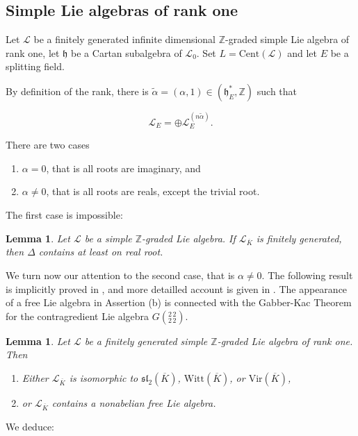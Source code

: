 \documentclass[11pt, letterpaper, reqno]{amsart}
\newtheorem{lemma}[theorem]{Lemma}
\theoremstyle{definition}
\newcommand{\Z}{{\mathbb Z}}
\newcommand{\cL}{\mathcal L}
\newcommand{\fsl}{\mathfrak{sl}}
\newcommand{\fh}{\mathfrak{h}}
\newcommand{\Cent}{\mathrm{Cent}}
\newcommand{\Vir}{\mathrm{Vir}}
\newcommand{\Witt}{\mathrm{Witt}}
\begin{document}
\subsection{Simple Lie algebras of rank one}
\label{rank1}

Let $\cL$ be a finitely generated infinite dimensional 
$\Z$-graded simple Lie algebra 
of rank one,  let $\fh$ be a Cartan subalgebra of $\cL_0$. Set $L=\Cent(\cL)$ and let $E$ be a splitting field.

By definition of the rank, there is 
$\tilde{\alpha}=(\alpha, 1)\in 
(\fh_E^*,\Z)$ such that

$$\cL_E=\oplus 
\cL_E^{(n\tilde{\alpha})}.$$

There are two cases
\begin{enumerate}
\item[(a)]$\alpha=0$, that is all roots are imaginary, and
\item[(b)]$\alpha\neq0$, that is all roots are reals, except the trivial root.
\end{enumerate}


The first case is impossible:

\begin{lemma}\cite[Lemma 22]{Mathieu-jalg} 
\label{V}
Let $\cL$ be a simple $\Z$-graded Lie algebra. If  $\cL_{\overline{K}}$ is finitely generated,  then $\Delta$ contains
at least on real root.
\end{lemma}

We turn now our attention to the second case, that is $\alpha\neq 0$.
The following result is implicitly proved in
\cite{Mathieu-inv2}, and more detailled account is given in \cite[theorem 5.8]{AndMath}. The appearance of a free Lie algebra in  Assertion (b) is connected with the
Gabber-Kac Theorem \cite{GabberKac} for the contragredient Lie algebra $G(^{2\,2}_{2\,2})$.

\begin{lemma}\label{S}
Let $\cL$ be a 
finitely generated simple $\Z$-graded Lie algebra of rank one. 
Then 
\begin{enumerate}
\item[(a)] Either $\cL_{\overline{K}}$ is isomorphic to $\fsl_2(\overline{K})$, $\Witt(\overline{K})$, or $\Vir(\overline{K})$, 
\item[(b)] or $\cL_{\overline{K}}$ contains 
a nonabelian free Lie algebra.
\end{enumerate} 
\end{lemma}

We deduce:
\end{document}
